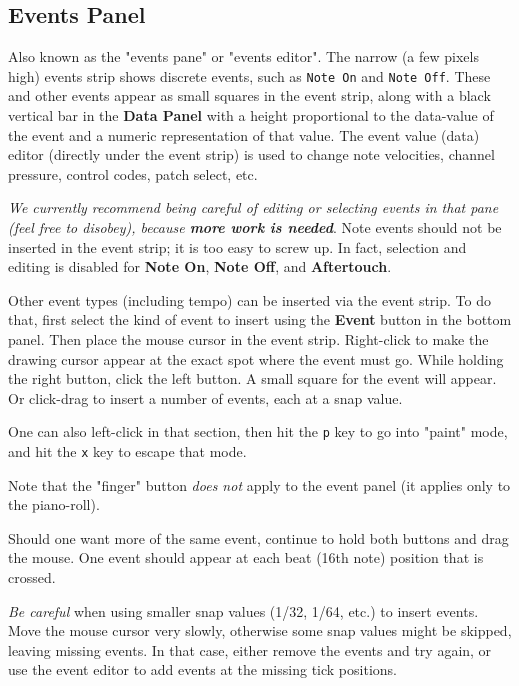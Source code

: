 \subsection{Events Panel}
\label{subsec:pattern_editor_panel}

   Also known as the "events pane" or "events editor".
   The narrow (a few pixels high) events strip shows discrete events,
   such as \texttt{Note On} and \texttt{Note Off}.
   These and other events appear
   as small squares in the event strip, along with a black vertical bar
   in the \textbf{Data Panel} with a
   height proportional to the data-value of the event and a numeric
   representation of that value.
	The event value (data) editor (directly under the event strip) is used 
	to change note velocities, channel pressure, control codes,
	patch select, etc.

   \textsl{We currently recommend being careful of editing or selecting events
   in that pane (feel free to disobey), because
   \textbf{more work is needed}}.
   Note events should not be inserted in the event strip; it is too easy to
   screw up.  In fact, selection and editing is disabled for
   \textbf{Note On}, \textbf{Note Off}, and \textbf{Aftertouch}.

   Other event types (including tempo) can be inserted via the event strip.
   To do that, first select the kind of event to insert using the
   \textbf{Event} button in the bottom panel.
   Then place the mouse cursor in the event strip.
   Right-click to make the drawing cursor appear at the exact spot where the
   event must go.  While holding the right button, click the left button.
   A small square for the event will appear. Or click-drag to insert a number
   of events, each at a snap value.

   One can also left-click in that section,
   then hit the \texttt{p} key to go into "paint" mode,
   and hit the \texttt{x} key to escape that mode.

   Note that the "finger" button \textsl{does not} apply to the event panel (it
   applies only to the piano-roll).

   Should one want more of the same event, continue to hold both buttons and
   drag the mouse.  One event should appear at each beat (16th note) position
   that is crossed.

   \textsl{Be careful}
   when using smaller snap values (1/32, 1/64, etc.) to insert events.
   Move the mouse cursor very slowly, otherwise some snap values might be
   skipped, leaving missing events.  In that case, either remove the events and
   try again, or use the event editor to add events at the missing tick
   positions.

